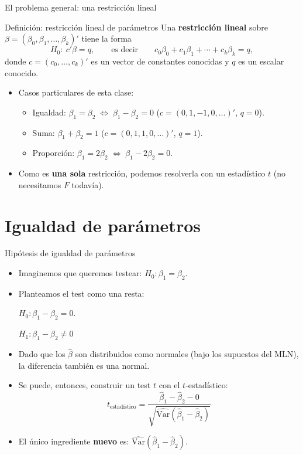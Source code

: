 \documentclass{beamer}
\begin{document}
\begin{frame}{El problema general: una restricción lineal}
\begin{block}{Definición: restricción lineal de parámetros}
Una \textbf{restricción lineal} sobre $\beta=(\beta_0,\beta_1,\dots,\beta_k)'$ tiene la forma
\[
H_0:\ c'\beta = q, \qquad\text{es decir}\qquad c_0\beta_0 + c_1\beta_1 + \cdots + c_k\beta_k = q,
\]
donde $c=(c_0,\dots,c_k)'$ es un vector de constantes conocidas y $q$ es un escalar conocido.
\end{block}
\pause
\begin{itemize}
    \item Casos particulares de esta clase:
    \begin{itemize}
        \item Igualdad: $\beta_1=\beta_2 \;\Leftrightarrow\; \beta_1-\beta_2=0$ \quad ($c=(0,1,-1,0,\dots)'$, $q=0$).
        \item Suma: $\beta_1+\beta_2=1$ \quad ($c=(0,1,1,0,\dots)'$, $q=1$).
        \item Proporción: $\beta_1=2\beta_2 \;\Leftrightarrow\; \beta_1-2\beta_2=0$.
    \end{itemize}
    \item Como es \textbf{una sola} restricción, podemos resolverla con un estadístico $t$ (no necesitamos $F$ todavía).
\end{itemize}
\end{frame}

\section{Igualdad de parámetros}

\begin{frame}{Hipótesis de igualdad de parámetros}
    \begin{itemize}
        \item Imaginemos que queremos testear: $H_0: \beta_1 = \beta_2$.
        \item Planteamos el test como una resta:

        $H_0: \beta_1 - \beta_2 = 0$.

        $H_1: \beta_1 - \beta_2 \neq 0$
        \item Dado que los $\hat{\beta}$ son distribuidos como normales (bajo los supuestos del MLN), la diferencia también es una normal.
        \item Se puede, entonces, construir un test $t$ con el $t$-estadístico:
        \[t_{\text{estadístico}} = \frac{\hat{\beta}_1 - \hat{\beta}_2 - 0}{\sqrt{\hat{\text{Var}}(\hat{\beta}_1 - \hat{\beta}_2)}}\]
        \item El único ingrediente \textbf{nuevo} es: $\hat{\text{Var}}(\hat{\beta}_1 - \hat{\beta}_2)$.
    \end{itemize}
\end{frame}
\end{document}
